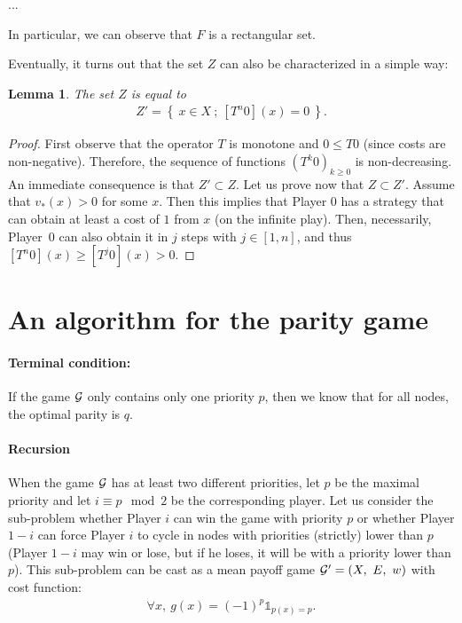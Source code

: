 \documentclass{article}
\newtheorem{lemma}{Lemma}
\def\1{{\mathds 1}}
\def\G{{\cal G}}
\def\pa{Player~0}
\begin{document}
...

In particular, we can observe that $F$ is a rectangular set.

Eventually, it turns out that the set $Z$ can also be characterized in a simple way:
\begin{lemma}
  The set $Z$ is equal to
  \begin{align}
    Z' = \left\{~ x \in X ~;~ [T^n 0](x) = 0 ~\right\}.
  \end{align}
\end{lemma}
\begin{proof}
  First observe that the operator $T$ is monotone and $0 \le T 0$ (since costs are non-negative). Therefore, the sequence of functions $(T^k 0)_{k \ge 0}$ is non-decreasing. An immediate consequence is that $Z' \subset Z$.
  Let us prove now that $Z \subset Z'$. Assume that $v_*(x)>0$ for some $x$. Then this implies that Player 0 has a strategy that can obtain at least a cost of $1$ from $x$ (on the infinite play). Then, necessarily, \pa{ }can also obtain it in $j$ steps with $j \in [1,n]$, and thus $[T^n 0](x) \ge [T^j 0](x)>0$.
\end{proof}

\section{An algorithm for the parity game}

\paragraph{Terminal condition:} If the game $\G$ only contains only one priority $p$, then we know that for all nodes, the optimal parity is $q$.
\paragraph{Recursion} When the game $\G$ has at least two different priorities, let $p$ be the maximal priority and let $i \equiv p \mod 2$ be the corresponding player. 
Let us consider the sub-problem whether Player $i$ can win the game with priority $p$ or whether Player $1-i$ can force Player $i$ to cycle in nodes with priorities (strictly) lower than $p$ (Player $1-i$ may win or lose, but if he loses, it will be with a priority lower than $p$). This sub-problem can be cast as a mean payoff game $\G'=(X,~ E,~ w)$ with cost function:
\begin{align}
  \forall x,~ g(x) = (-1)^p \1_{p(x)=p}.
\end{align}
\end{document}

